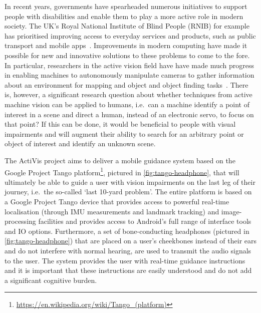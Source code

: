 \documentclass{llncs}
\begin{document}
In recent years, governments have spearheaded numerous initiatives to support people with disabilities and enable them to play a more active role in modern society.
The UK's Royal National Institute of Blind People (RNIB) for example has prioritised improving access to everyday services and products, such as public transport and mobile apps~\cite{rnib2016uk}.
Improvements in modern computing have made it possible for new and innovative solutions to these problems to come to the fore.
In particular, researchers in the active vision field have have made much progress in enabling machines to autonomously manipulate cameras to gather information about an environment for mapping and object and object finding tasks~\cite{bajcsy2018revisiting}.
There is, however, a significant research question about whether techniques from active machine vision can be applied to humans, i.e.\ can a machine identify a point of interest in a scene and direct a human, instead of an electronic servo, to focus on that point?
If this can be done, it would be beneficial to people with visual impairments and will augment their ability to search for an arbitrary point or object of interest and identify an unknown scene. 

The ActiVis project aims to deliver a mobile guidance system based on the Google Project Tango platform\footnote{\url{https://en.wikipedia.org/wiki/Tango\_(platform)}}, pictured in \cref{fig:tango-headphone}, that will ultimately be able to guide a user with vision impairments on the last leg of their journey, i.e.\ the so-called `last 10-yard problem'. 
The entire platform is based on a Google Project Tango device that provides access to powerful real-time localisation (through IMU measurements and landmark tracking) and image-processing facilities and provides access to Android's full range of interface tools and IO options. 
Furthermore, a set of bone-conducting headphones (pictured in \cref{fig:tango-headphone}) that are placed on a user's cheekbones instead of their ears and do not interfere with normal hearing, are used to transmit the audio signals to the user.
The system provides the user with real-time guidance instructions and it is important that these instructions are easily understood and do not add a significant cognitive burden. 
\end{document}
